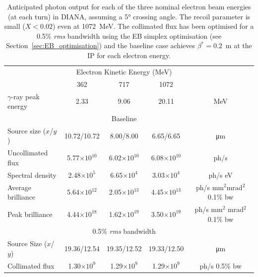 \documentclass[../main.tex]{subfiles}
\begin{document}
\begin{table}[!h]
\caption{Anticipated photon output for each of the three nominal electron beam energies (at each turn) in DIANA, assuming a 5\si{\degree} crossing angle. The recoil parameter is small ($X < 0.02$) even at 1072~\si{\mega\electronvolt}. The collimated flux has been optimised for a 0.5\% \textit{rms} bandwidth using the EB simplex optimisation (see Section~\ref{sec:EB_optimisation}) and the baseline case achieves $\beta^{*} =0.2$~\si{\meter} at the IP for each electron energy.}
\vspace{3mm}
\centering
\begin{threeparttable}
\begin{tabular}{lcccc}
\hline\hline
 & \multicolumn{3}{c}{Electron Kinetic Energy (\si{\mega\electronvolt})} & \\
 \cline{2-4}
 & 362 & 717 & 1072 & \\
\hline
$\gamma$-ray peak energy  & 2.33 & 9.06 & 20.11 & \si{\mega\electronvolt}\\
\hline
 & \multicolumn{3}{c}{Baseline} & \\
\hline
Source size ($x$/$y$)  & 10.72/10.72 & 8.00/8.00 & 6.65/6.65 & \si{\micro\meter} \\
Uncollimated flux  & 5.77$\times 10^{10}$ & 6.02$\times 10^{10}$ & 6.08$\times 10^{10}$ & ph/\si{\second}\\
Spectral density  & 2.48$\times 10^{5}$ & 6.65$\times 10^{4}$ & 3.03$\times 10^{4}$ & ph/\si{\second} \si{\electronvolt}\\
Average brilliance  & 5.64$\times 10^{12}$ & 2.05$\times 10^{13}$ & 4.45$\times 10^{13}$ & ph/\si{\second} \si{\milli\meter}$^{2}$\si{\milli\radian}$^{2}$ 0.1\% bw\\
Peak brilliance\tnote{*}  & 4.44$\times 10^{18}$ & 1.62$\times 10^{19}$ & 3.50$\times 10^{19}$ & ph/\si{\second} \si{\milli\meter}$^{2}$ \si{\milli\radian}$^{2}$ 0.1\% bw\\
\hline
 & \multicolumn{3}{c}{0.5\% \textit{rms} bandwidth} & \\
\hline
Source Size ($x$/$y$) & 19.36/12.54 & 19.35/12.52 & 19.33/12.50 & \si{\micro\meter} \\ 
Collimated flux  & 1.30$\times 10^{9}$ & 1.29$\times 10^{9}$ & 1.29$\times 10^{9}$ & ph/\si{\second} 0.5\% bw \\
\hline\hline
\end{tabular}
\begin{tablenotes}
\end{tablenotes}
\end{threeparttable}
\label{tab:DIANA_spectral_output}
\end{table}
\end{document}

